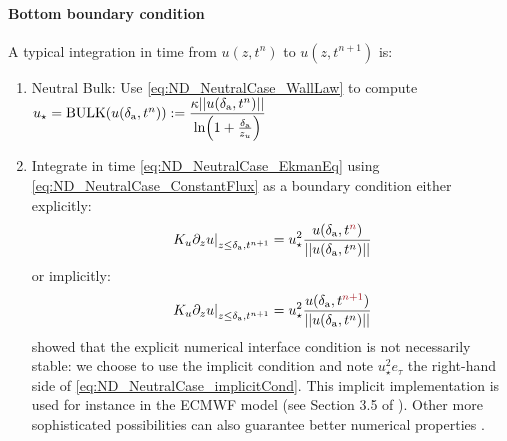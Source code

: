 \paragraph{Bottom boundary condition}
A typical integration in time from $u(z, t^{n})$ to
$u(z, t^{n+1})$ is:
\begin{enumerate}
	\item Neutral Bulk: Use \eqref{eq:ND_NeutralCase_WallLaw}
		to compute $u_\star = {\rm BULK}(u(\delta_{\rm a}, t^n))
		:= \displaystyle \frac{\kappa ||u(\delta_{\rm a}, t^n)||}
			{\ln(1+\frac{\delta_{\rm a}}{z_{u}})}$
  \item Integrate in time \eqref{eq:ND_NeutralCase_EkmanEq}
  using \eqref{eq:ND_NeutralCase_ConstantFlux} as a boundary condition
		either explicitly: 
	\begin{equation}
		\left.K_u \partial_z u
		\right|_{z\leq \delta_{\rm a}, t^{n+1}}
		= u_\star^2 \frac{u(\delta_{\rm a},
		t^{\emphase{n}})}
		{||u(\delta_{\rm a}, t^n)||}
	\end{equation}
		or implicitly:
	\begin{equation}
		\label{eq:ND_NeutralCase_implicitCond}
		\left.K_u \partial_z u
		\right|_{z\leq \delta_{\rm a}, t^{n+1}}
		= u_\star^2 \frac{u(\delta_{\rm a},
		t^{\emphase{n+1}})}
		{||u(\delta_{\rm a}, t^n)||}
	\end{equation}
	\citep{lemarie_stability_2015} showed that the explicit
	numerical interface condition is not necessarily
	stable: we choose to use the implicit condition and note
		$u_\star^2 e_\tau$ the right-hand side of
		\eqref{eq:ND_NeutralCase_implicitCond}.
	This implicit implementation is used for instance in the
	ECMWF model (see Section 3.5 of \citep{ecmwf_ifs_2020}).
	Other more sophisticated possibilities can also guarantee
	better numerical properties \citep{connors_decoupled_2012}.
\end{enumerate}
